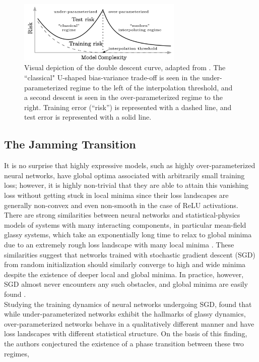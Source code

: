 \documentclass[a4paper, 12pt]{article}
\begin{document}
\begin{figure}[ht]
\centering
\includegraphics[width=0.7\textwidth]{docs/assets/double_descent_reconciling.png}
\caption{Visual depiction of the double descent curve, adapted from \cite{belkinReconcilingModernMachine2019}. The ``classical" U-shaped bias-variance trade-off is seen in the under-parameterized regime to the left of the interpolation threshold, and a second descent is seen in the over-parameterized regime to the right. Training error (``risk'') is represented with a dashed line, and test error is represented with a solid line.}
\label{doubledescent}
\end{figure}



\subsection{The Jamming Transition}

It is no surprise that highly expressive models, such as highly over-parameterized neural networks, have global optima associated with arbitrarily small training loss; however, it is highly non-trivial that they are able to attain this vanishing loss without getting stuck in local minima since their loss landscapes are generally non-convex and even non-smooth in the case of ReLU activations. There are strong similarities between neural networks and statistical-physics models of systems with many interacting components, in particular mean-field glassy systems, which take an exponentially long time to relax to global minima due to an extremely rough loss landscape with many local minima \cite{choromanskaLossSurfacesMultilayer}. These similarities suggest that networks trained with stochastic gradient descent (SGD) from random initialization should similarly converge to high and wide minima despite the existence of deeper local and global minima. In practice, however, SGD almost never encounters any such obstacles, and global minima are easily found \cite{goodfellowQualitativelyCharacterizingNeural2015}.\\

Studying the training dynamics of neural networks undergoing SGD, \cite{baity-jesiComparingDynamicsDeep2019} found that while under-parameterized networks exhibit the hallmarks of glassy dynamics, over-parameterized networks behave in a qualitatively different manner and have loss landscapes with different statistical structure. On the basis of this finding, the authors conjectured the existence of a phase transition between these two regimes, 
\end{document}
